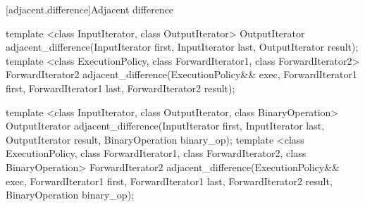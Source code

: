 [adjacent.difference]{Adjacent difference}

%
\begin{itemdecl}
template <class InputIterator, class OutputIterator>
  OutputIterator
    adjacent_difference(InputIterator first, InputIterator last,
                        OutputIterator result);
template <class ExecutionPolicy, class ForwardIterator1, class ForwardIterator2>
  ForwardIterator2
    adjacent_difference(ExecutionPolicy&& exec,
                        ForwardIterator1 first, ForwardIterator1 last,
                        ForwardIterator2 result);

template <class InputIterator, class OutputIterator, class BinaryOperation>
  OutputIterator
    adjacent_difference(InputIterator first, InputIterator last,
                        OutputIterator result,
                        BinaryOperation binary_op);
template <class ExecutionPolicy, class ForwardIterator1, class ForwardIterator2, class BinaryOperation>
  ForwardIterator2
    adjacent_difference(ExecutionPolicy&& exec,
                        ForwardIterator1 first, ForwardIterator1 last,
                        ForwardIterator2 result,
                        BinaryOperation binary_op);
\end{itemdecl}

